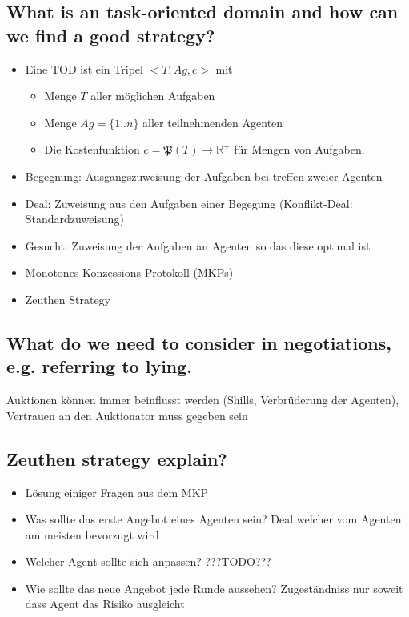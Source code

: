 \subsection{What is an task-oriented domain and how can we find a good strategy?}
\begin{itemize}
	\item Eine TOD ist ein Tripel $<T,Ag,c>$ mit \begin{itemize}
		\item Menge $T$ aller möglichen Aufgaben
		\item Menge $Ag=\{1..n\}$ aller teilnehmenden Agenten
		\item Die Kostenfunktion $c = \mathfrak{P}(T)\rightarrow\mathbb{R}^+$ für Mengen von Aufgaben.
	\end{itemize}
	\item Begegnung: Ausgangszuweisung der Aufgaben bei treffen zweier Agenten
	\item Deal: Zuweisung aus den Aufgaben einer Begegung (Konflikt-Deal: Standardzuweisung)
	\item Gesucht: Zuweisung der Aufgaben an Agenten so das diese optimal ist
	\item Monotones Konzessions Protokoll (MKPs)
	\item Zeuthen Strategy
\end{itemize}
\subsection{What do we need to consider in negotiations, e.g. referring to lying.}
Auktionen können immer beinflusst werden (Shills, Verbrüderung der Agenten), Vertrauen an den Auktionator muss gegeben sein
\subsection{Zeuthen strategy explain?}
\begin{itemize}
	\item Lösung einiger Fragen aus dem MKP
	\item Was sollte das erste Angebot eines Agenten sein? Deal welcher vom Agenten am meisten bevorzugt wird
	\item Welcher Agent sollte sich anpassen? ???TODO???
	\item Wie sollte das neue Angebot jede Runde aussehen?  Zugeständniss nur soweit dass Agent das Risiko ausgleicht
\end{itemize}
